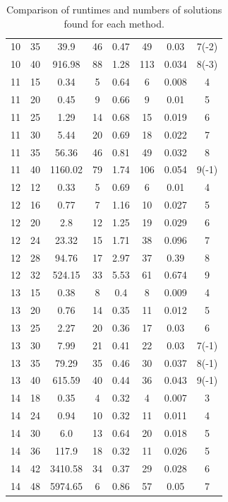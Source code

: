 \documentclass[11pt,authoryear,a4paper]{article}
\theoremstyle{definition}
\begin{document}
\begin{table}[tbp]
\begin{tabular}{cccccccc}
10        & 35     & 39.9    & 46        & 0.47 & 49        & 0.03  & 7(-2)\\
10        & 40     & 916.98  & 88        & 1.28 & 113       & 0.034 & 8(-3)\\
11        & 15     & 0.34    & 5         & 0.64 & 6         & 0.008 & 4         \\
11        & 20     & 0.45    & 9         & 0.66 & 9         & 0.01  & 5         \\
11        & 25     & 1.29    & 14        & 0.68 & 15        & 0.019 & 6         \\
11        & 30     & 5.44    & 20        & 0.69 & 18        & 0.022 & 7         \\
11        & 35     & 56.36   & 46        & 0.81 & 49        & 0.032 & 8         \\
11        & 40     & 1160.02 & 79        & 1.74 & 106       & 0.054 & 9(-1)\\
12        & 12     & 0.33    & 5         & 0.69 & 6         & 0.01  & 4         \\
12        & 16     & 0.77    & 7         & 1.16 & 10        & 0.027 & 5         \\
12        & 20     & 2.8     & 12        & 1.25 & 19        & 0.029 & 6         \\
12        & 24     & 23.32   & 15        & 1.71 & 38        & 0.096 & 7         \\
12        & 28     & 94.76   & 17        & 2.97 & 37        & 0.39  & 8         \\
12        & 32     & 524.15  & 33        & 5.53 & 61        & 0.674 & 9         \\
13        & 15     & 0.38    & 8         & 0.4  & 8         & 0.009 & 4         \\
13        & 20     & 0.76    & 14        & 0.35 & 11        & 0.012 & 5         \\
13        & 25     & 2.27    & 20        & 0.36 & 17        & 0.03  & 6         \\
13        & 30     & 7.99    & 21        & 0.41 & 22        & 0.03  & 7(-1)\\
13        & 35     & 79.29   & 35        & 0.46 & 30        & 0.037 & 8(-1)\\
13        & 40     & 615.59  & 40        & 0.44 & 36        & 0.043 & 9(-1)\\
14        & 18     & 0.35    & 4         & 0.32 & 4         & 0.007 & 3         \\
14        & 24     & 0.94    & 10        & 0.32 & 11        & 0.011 & 4         \\
14        & 30     & 6.0     & 13        & 0.64 & 20        & 0.018 & 5         \\
14        & 36     & 117.9   & 18        & 0.32 & 11        & 0.026 & 5         \\
14        & 42     & 3410.58 & 34        & 0.37 & 29        & 0.028 & 6         \\
14        & 48     & 5974.65 & 6         & 0.86 & 57        & 0.05  & 7
    \end{tabular}
\caption{Comparison of runtimes and numbers of solutions found for each method.}
\end{table}
\end{document}
